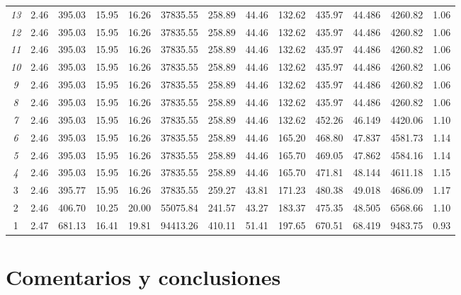 \documentclass[letterpaper,11pt]{article} %
\begin{document}
\begin{table}[H]
\begin{adjustbox}{angle=90}
{\begin{tabular}{|ccccccccccccc|}
    \textit{13} & 2.46  & 395.03 & 15.95 & 16.26 & 37835.55 & 258.89 & 44.46 & 132.62 & 435.97 & 44.486 & 4260.82 & 1.06 \\
    \textit{12} & 2.46  & 395.03 & 15.95 & 16.26 & 37835.55 & 258.89 & 44.46 & 132.62 & 435.97 & 44.486 & 4260.82 & 1.06 \\
    \textit{11} & 2.46  & 395.03 & 15.95 & 16.26 & 37835.55 & 258.89 & 44.46 & 132.62 & 435.97 & 44.486 & 4260.82 & 1.06 \\
    \textit{10} & 2.46  & 395.03 & 15.95 & 16.26 & 37835.55 & 258.89 & 44.46 & 132.62 & 435.97 & 44.486 & 4260.82 & 1.06 \\
    \textit{9} & 2.46  & 395.03 & 15.95 & 16.26 & 37835.55 & 258.89 & 44.46 & 132.62 & 435.97 & 44.486 & 4260.82 & 1.06 \\
    \textit{8} & 2.46  & 395.03 & 15.95 & 16.26 & 37835.55 & 258.89 & 44.46 & 132.62 & 435.97 & 44.486 & 4260.82 & 1.06 \\
    \textit{7} & 2.46  & 395.03 & 15.95 & 16.26 & 37835.55 & 258.89 & 44.46 & 132.62 & 452.26 & 46.149 & 4420.06 & 1.10 \\
    \textit{6} & 2.46  & 395.03 & 15.95 & 16.26 & 37835.55 & 258.89 & 44.46 & 165.20 & 468.80 & 47.837 & 4581.73 & 1.14 \\
    \textit{5} & 2.46  & 395.03 & 15.95 & 16.26 & 37835.55 & 258.89 & 44.46 & 165.70 & 469.05 & 47.862 & 4584.16 & 1.14 \\
    \textit{4} & 2.46  & 395.03 & 15.95 & 16.26 & 37835.55 & 258.89 & 44.46 & 165.70 & 471.81 & 48.144 & 4611.18 & 1.15 \\
    3     & 2.46  & 395.77 & 15.95 & 16.26 & 37835.55 & 259.27 & 43.81 & 171.23 & 480.38 & 49.018 & 4686.09 & 1.17 \\
    2     & 2.46  & 406.70 & 10.25 & 20.00 & 55075.84 & 241.57 & 43.27 & 183.37 & 475.35 & 48.505 & 6568.66 & 1.10 \\
    1     & 2.47  & 681.13 & 16.41 & 19.81 & 94413.26 & 410.11 & 51.41 & 197.65 & 670.51 & 68.419 & 9483.75 & 0.93 \bigstrut[b]\\
    \hline
    \end{tabular}
    }
    \end{adjustbox}
 \label{plresumen}%
\end{table}

\newpage
\section{Comentarios y conclusiones}
\end{document}
